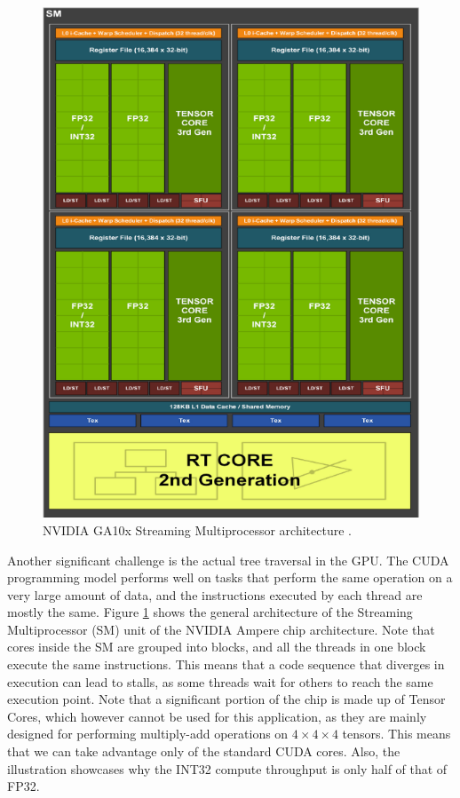 \begin{figure}
    \centering
    \includegraphics[width=0.7\linewidth]{figures/nvidia_arch.png}
    \caption{NVIDIA GA10x Streaming Multiprocessor architecture \cite{ha107}.}
    \label{fig:nvidia-label}
\end{figure}

Another significant challenge is the actual tree traversal in the GPU. The CUDA programming model performs well on tasks that perform the same operation on a very large amount of data, and the instructions executed by each thread are mostly the same. Figure \ref{fig:nvidia-label} shows the general architecture of the Streaming Multiprocessor (SM) unit of the NVIDIA Ampere chip architecture. Note that cores inside the SM are grouped into blocks, and all the threads in one block execute the same instructions. This means that a code sequence that diverges in execution can lead to stalls, as some threads wait for others to reach the same execution point. Note that a significant portion of the chip is made up of Tensor Cores, which however cannot be used for this application, as they are mainly designed for performing multiply-add operations on $4\times 4 \times 4$ tensors. This means that we can take advantage only of the standard CUDA cores. Also, the illustration showcases why the INT32 compute throughput is only half of that of FP32.

